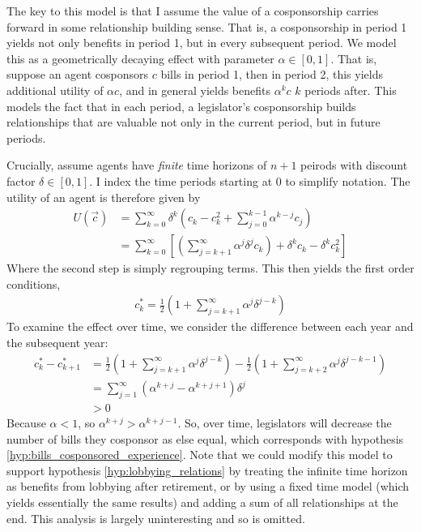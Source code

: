 \documentclass{article}
\begin{document}
The key to this model is that I assume the value of a cosponsorship carries forward in some relationship building sense. That is, a cosponsorship in period 1 yields not only benefits in period 1, but in every subsequent period. We model this as a geometrically decaying effect with parameter $\alpha \in [0, 1]$. That is, suppose an agent cosponsors $c$ bills in period 1, then in period 2, this yields additional utility of $\alpha c$, and in general yields benefits $\alpha^k c$ $k$ periods after. This models the fact that in each period, a legislator's cosponsorship builds relationships that are valuable not only in the current period, but in future periods. 

Crucially, assume agents have \emph{finite} time horizons of $n + 1$ peirods with discount factor $\delta \in [0, 1]$. I index the time periods starting at 0 to simplify notation. The utility of an agent is therefore given by
\begin{align*}
  U(\vec{c}) &= \sum_{k = 0}^\infty \delta^k\left(c_k - c_k^2 + \sum_{j = 0}^{k - 1} \alpha^{k - j} c_j\right) \\
  &= \sum_{k = 0}^\infty\left[\left(\sum_{j = k + 1}^\infty \alpha^j \delta^j c_k\right) + \delta^k c_k - \delta^k c_k^2\right]
\end{align*}
Where the second step is simply regrouping terms. This then yields the first order conditions,
\begin{align*}
  c_k^* = \frac{1}{2} \left(1 + \sum_{j = k + 1}^\infty \alpha^j \delta^{j - k}\right)
\end{align*}
To examine the effect over time, we consider the difference between each year and the subsequent year:
\begin{align*}
  c_{k}^* - c_{k + 1}^* &= \frac{1}{2} \left(1 + \sum_{j = k + 1}^\infty \alpha^j \delta^{j - k}\right) - \frac{1}{2} \left(1 + \sum_{j = k + 2}^\infty \alpha^j \delta^{j - k - 1}\right) \\
  &= \sum_{j = 1}^\infty (\alpha^{k + j} - \alpha^{k + j + 1})\delta^j \\
  &> 0
\end{align*}
Because $\alpha < 1$, so $\alpha^{k + j} > \alpha^{k + j - 1}$. So, over time, legislators will decrease the number of bills they cosponsor as else equal, which corresponds with hypothesis \ref{hyp:bills_cosponsored_experience}. Note that we could modify this model to support hypothesis \ref{hyp:lobbying_relations} by treating the infinite time horizon as benefits from lobbying after retirement, or by using a fixed time model (which yields essentially the same results) and adding a sum of all relationships at the end. This analysis is largely uninteresting and so is omitted. 
\end{document}
